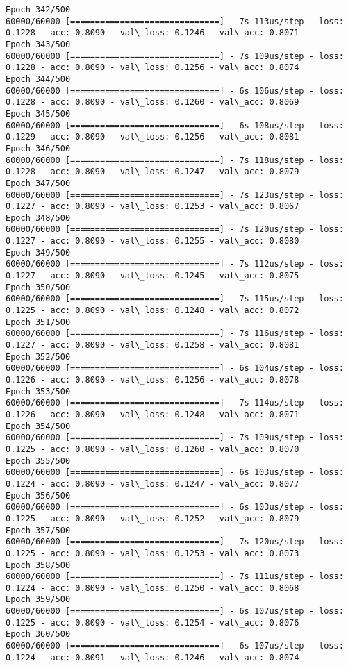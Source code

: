 \documentclass[11pt]{article}
\begin{document}
\begin{Verbatim}[commandchars=\\\{\}]
Epoch 342/500
60000/60000 [==============================] - 7s 113us/step - loss: 0.1228 - acc: 0.8090 - val\_loss: 0.1246 - val\_acc: 0.8071
Epoch 343/500
60000/60000 [==============================] - 7s 109us/step - loss: 0.1228 - acc: 0.8090 - val\_loss: 0.1256 - val\_acc: 0.8074
Epoch 344/500
60000/60000 [==============================] - 6s 106us/step - loss: 0.1228 - acc: 0.8090 - val\_loss: 0.1260 - val\_acc: 0.8069
Epoch 345/500
60000/60000 [==============================] - 6s 108us/step - loss: 0.1229 - acc: 0.8090 - val\_loss: 0.1256 - val\_acc: 0.8081
Epoch 346/500
60000/60000 [==============================] - 7s 118us/step - loss: 0.1228 - acc: 0.8090 - val\_loss: 0.1247 - val\_acc: 0.8079
Epoch 347/500
60000/60000 [==============================] - 7s 123us/step - loss: 0.1227 - acc: 0.8090 - val\_loss: 0.1253 - val\_acc: 0.8067
Epoch 348/500
60000/60000 [==============================] - 7s 120us/step - loss: 0.1227 - acc: 0.8090 - val\_loss: 0.1255 - val\_acc: 0.8080
Epoch 349/500
60000/60000 [==============================] - 7s 112us/step - loss: 0.1227 - acc: 0.8090 - val\_loss: 0.1245 - val\_acc: 0.8075
Epoch 350/500
60000/60000 [==============================] - 7s 115us/step - loss: 0.1225 - acc: 0.8090 - val\_loss: 0.1248 - val\_acc: 0.8072
Epoch 351/500
60000/60000 [==============================] - 7s 116us/step - loss: 0.1227 - acc: 0.8090 - val\_loss: 0.1258 - val\_acc: 0.8081
Epoch 352/500
60000/60000 [==============================] - 6s 104us/step - loss: 0.1226 - acc: 0.8090 - val\_loss: 0.1256 - val\_acc: 0.8078
Epoch 353/500
60000/60000 [==============================] - 7s 114us/step - loss: 0.1226 - acc: 0.8090 - val\_loss: 0.1248 - val\_acc: 0.8071
Epoch 354/500
60000/60000 [==============================] - 7s 109us/step - loss: 0.1225 - acc: 0.8090 - val\_loss: 0.1260 - val\_acc: 0.8070
Epoch 355/500
60000/60000 [==============================] - 6s 103us/step - loss: 0.1224 - acc: 0.8090 - val\_loss: 0.1247 - val\_acc: 0.8077
Epoch 356/500
60000/60000 [==============================] - 6s 103us/step - loss: 0.1225 - acc: 0.8090 - val\_loss: 0.1252 - val\_acc: 0.8079
Epoch 357/500
60000/60000 [==============================] - 7s 120us/step - loss: 0.1225 - acc: 0.8090 - val\_loss: 0.1253 - val\_acc: 0.8073
Epoch 358/500
60000/60000 [==============================] - 7s 111us/step - loss: 0.1224 - acc: 0.8090 - val\_loss: 0.1250 - val\_acc: 0.8068
Epoch 359/500
60000/60000 [==============================] - 6s 107us/step - loss: 0.1225 - acc: 0.8090 - val\_loss: 0.1254 - val\_acc: 0.8076
Epoch 360/500
60000/60000 [==============================] - 6s 107us/step - loss: 0.1224 - acc: 0.8091 - val\_loss: 0.1246 - val\_acc: 0.8074

\end{Verbatim}
\end{document}
